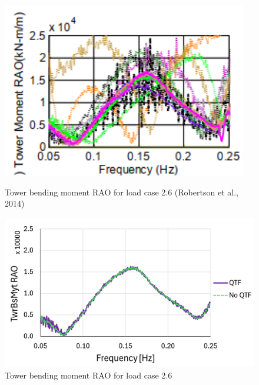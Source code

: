 \documentclass[a4paper, 11pt]{article}
\begin{document}
\begin{figure}[H]
    \begin{minipage}{0.48\textwidth}
        \centering
        \includegraphics[width=0.95\textwidth]{2.6_twr.png}
        \caption{\small Tower bending moment RAO for load case 2.6 (Robertson et al., 2014)}
        \label{fig:2.6_twr}
    \end{minipage}
    \hfill
    \begin{minipage}{0.5\textwidth}
        \centering
        \vspace{0.6cm}
        \includegraphics[width=1\textwidth]{2.6_twr_mine.png}
        \caption{\small Tower bending moment RAO for load case 2.6} 
        \label{fig:2.6_twr_mine}
    \end{minipage}
\end{figure}
\end{document}
